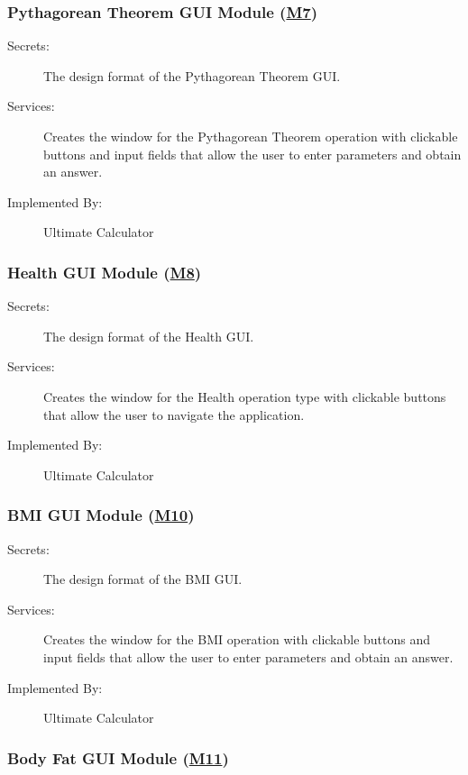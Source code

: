 \documentclass[12pt, titlepage]{article}
\begin{document}
\subsubsection{Pythagorean Theorem GUI Module (\hyperref[m7]{M7})}

\begin{description}
\item[Secrets:]The design format of the Pythagorean Theorem GUI.
\item[Services:] Creates the window for the Pythagorean Theorem operation with clickable buttons and input fields that allow the user to enter parameters and obtain an answer.
\item[Implemented By:] Ultimate Calculator
\end{description}

\subsubsection{Health GUI Module (\hyperref[m8]{M8})}

\begin{description}
\item[Secrets:]The design format of the Health GUI.
\item[Services:] Creates the window for the Health operation type with clickable buttons that allow the user to navigate the application.
\item[Implemented By:] Ultimate Calculator
\end{description}

\subsubsection{BMI GUI Module (\hyperref[m10]{M10})}

\begin{description}
\item[Secrets:]The design format of the BMI GUI.
\item[Services:] Creates the window for the BMI operation with clickable buttons and input fields that allow the user to enter parameters and obtain an answer.
\item[Implemented By:] Ultimate Calculator
\end{description}

\subsubsection{Body Fat GUI Module (\hyperref[m11]{M11})}
\end{document}
